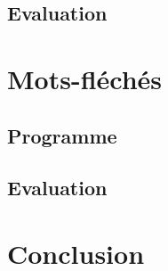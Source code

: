 \documentclass{article}
\begin{document}
\subsection{Evaluation}


\section{Mots-fléchés}
\subsection{Programme}

\subsection{Evaluation}


\section{Conclusion}
\end{document}
